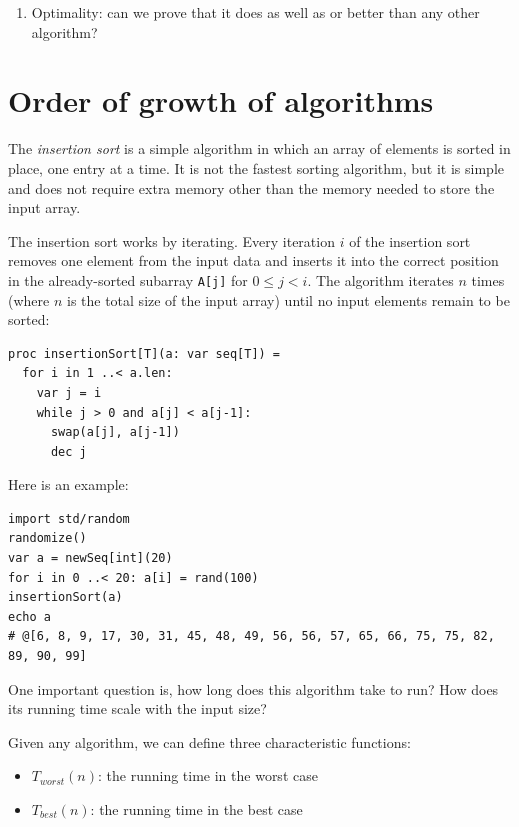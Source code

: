 \documentclass[justified, sixbynine]{tufte-book}
\def\ft{\small\tt}
\theoremstyle{plain}%
\newtheorem * {corollary}{Corollary}
\theoremstyle{definition}
\theoremstyle{remark}
\newtheorem * {remark}{Remark}
\newtheorem * {note}{Note}
\begin{document}
\begin{fullwidth}
\begin{enumerate}
\item  Optimality: can we prove that it does as well as or better than any other algorithm?
\end{enumerate}

\goodbreak\section{Order of growth of algorithms}

\index{$\Theta$}\index{$\Omega$}\index{$\omega$}


The {\it insertion sort} is a simple algorithm in which an array of elements is sorted in place, one entry at a time. It is not the fastest sorting algorithm, but it is simple and does not require extra memory other than the memory needed to store the input array.

The insertion sort works by iterating. Every iteration $i$ of the insertion sort removes one element from the input data and inserts it into the correct position in the already-sorted subarray {\ft A[j]} for $0 \le j < i$. The algorithm iterates $n$ times (where $n$ is the total size of the input array) until no input elements remain to be sorted:

\begin{lstlisting}
proc insertionSort[T](a: var seq[T]) =
  for i in 1 ..< a.len:
    var j = i
    while j > 0 and a[j] < a[j-1]:
      swap(a[j], a[j-1])
      dec j
\end{lstlisting}

Here is an example:

\begin{lstlisting}
import std/random
randomize()
var a = newSeq[int](20)
for i in 0 ..< 20: a[i] = rand(100)
insertionSort(a)
echo a
# @[6, 8, 9, 17, 30, 31, 45, 48, 49, 56, 56, 57, 65, 66, 75, 75, 82, 89, 90, 99]
\end{lstlisting}

One important question is, how long does this algorithm take to run? How does its running time scale with the input size?

Given any algorithm, we can define three characteristic functions:

\begin{itemize}
\item  $T_{worst}(n)$: the running time in the worst case

\item  $T_{best}(n)$: the running time in the best case


\end{itemize}
\end{fullwidth}
\end{document}
